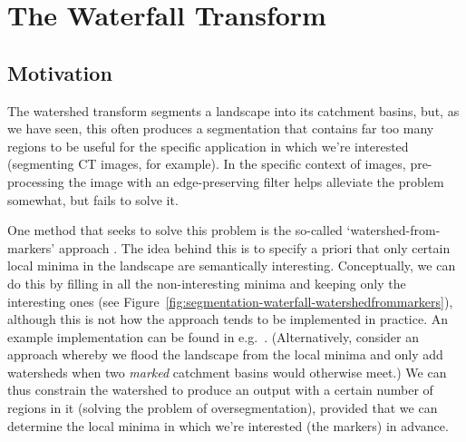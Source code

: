 \section{The Waterfall Transform}
\label{sec:segmentation-waterfall}

\subsection{Motivation}

The watershed transform segments a landscape into its catchment basins, but, as we have seen, this often produces a segmentation that contains far too many regions to be useful for the specific application in which we're interested (segmenting CT images, for example). In the specific context of images, pre-processing the image with an edge-preserving filter helps alleviate the problem somewhat, but fails to solve it.

One method that seeks to solve this problem is the so-called `watershed-from-markers' approach \cite{meyer90}. The idea behind this is to specify a priori that only certain local minima in the landscape are semantically interesting. Conceptually, we can do this by filling in all the non-interesting minima and keeping only the interesting ones (see Figure~\ref{fig:segmentation-waterfall-watershedfrommarkers}), although this is not how the approach tends to be implemented in practice. An example implementation can be found in e.g.~\cite{felkel01}. (Alternatively, consider an approach whereby we flood the landscape from the local minima and only add watersheds when two \emph{marked} catchment basins would otherwise meet.) We can thus constrain the watershed to produce an output with a certain number of regions in it (solving the problem of oversegmentation), provided that we can determine the local minima in which we're interested (the markers) in advance.

